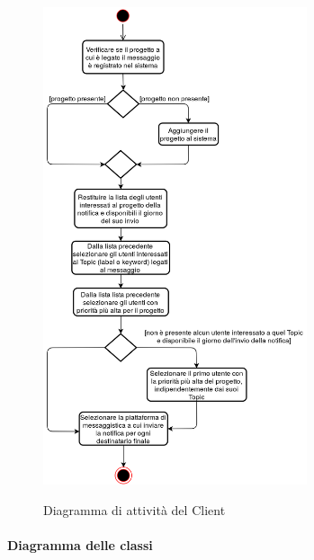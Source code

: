 \begin{figure}[H]
    \centering
    \includegraphics[width=0.69\textwidth]{img/Client_attivita.png}\\
    \caption{Diagramma di attività del Client}
\end{figure}

    \paragraph{Diagramma delle classi}

